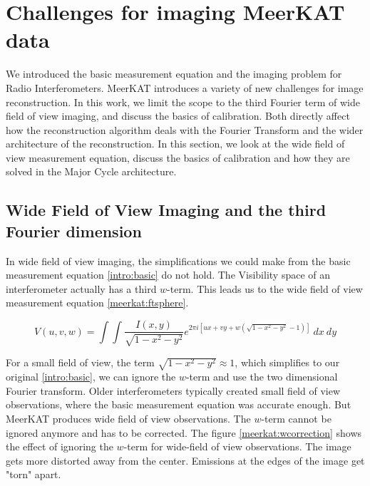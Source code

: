 \section{Challenges for imaging MeerKAT data} \label{meerkat}
We introduced the basic measurement equation and the imaging problem for Radio Interferometers. MeerKAT introduces a variety of new challenges for image reconstruction. In this work, we limit the scope to the third Fourier term of wide field of view imaging, and discuss the basics of calibration. Both directly affect how the reconstruction algorithm deals with the Fourier Transform and the wider architecture of the reconstruction. In this section, we look at the wide field of view measurement equation, discuss the basics of calibration and how they are solved in the Major Cycle architecture.


\subsection{Wide Field of View Imaging and the third Fourier dimension} \label{meerkat:wof}
In wide field of view imaging, the simplifications we could make from the basic measurement equation \eqref{intro:basic} do not hold. The Visibility space of an interferometer actually has a third $w$-term. This leads us to the wide field of view measurement equation \eqref{meerkat:ftsphere}.

\begin{equation}\label{meerkat:ftsphere}
V(u, v, w) = \int\int \frac{I(x, y)}{\sqrt{1 - x^2 - y ^2}} e^{2 \pi i [ux+vy+ w(\sqrt{1 - x^2 - y ^2} - 1)]} \: dx \: dy
\end{equation}

For a small field of view, the term  $\sqrt{1 - x^2 - y ^2} \approx 1$, which simplifies to our original \eqref{intro:basic}, we can ignore the $w$-term and use the two dimensional Fourier transform. Older interferometers typically created small field of view observations, where the basic measurement equation was accurate enough. But MeerKAT produces wide field of view observations. The $w$-term cannot be ignored anymore and has to be corrected. The figure \ref{meerkat:wcorrection} shows the effect of ignoring the $w$-term for wide-field of view observations. The image gets more distorted away from the center. Emissions at the edges of the image get "torn" apart.

